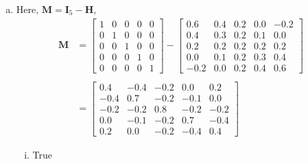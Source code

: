 \documentclass[12pt,letterpaper, onecolumn]{exam}
\begin{document}
\begin{questions}
\begin{solution}
\begin{enumerate}[a.)]
\begin{enumerate}[i.)]
            The identity of,
            \begin{equation*}
                \sum\limits_{i=1}^{n}\textbf{e}_i=0
            \end{equation*}
            does not hold if the intercept drops. 
        \end{enumerate}
        \item Here, $\textbf{M} = \textbf{I}_5 - \textbf{H}$,
        \begin{align*}
            \textbf{M} &= \left[\begin{array}{ccccc}
                1 & 0 & 0 & 0 & 0 \\
                0 & 1 & 0 & 0 & 0 \\
                0 & 0 & 1 & 0 & 0 \\
                0 & 0 & 0 & 1 & 0 \\
                0 & 0 & 0 & 0 & 1
            \end{array} \right] - \left[\begin{array}{ccccc}
                 0.6 & 0.4 & 0.2 & 0.0 & -0.2 \\
                 0.4 & 0.3 & 0.2 & 0.1 &  0.0 \\
                 0.2 & 0.2 & 0.2 & 0.2 &  0.2 \\
                 0.0 & 0.1 & 0.2 & 0.3 &  0.4 \\
                -0.2 & 0.0 & 0.2 & 0.4 &  0.6
            \end{array}\right] \\ \\
            & = \left[\begin{array}{ccccc}
                 0.4 & -0.4 & -0.2 &  0.0 &  0.2 \\
                -0.4 &  0.7 & -0.2 & -0.1 &  0.0 \\
                -0.2 & -0.2 &  0.8 & -0.2 & -0.2 \\
                 0.0 & -0.1 & -0.2 &  0.7 & -0.4 \\
                 0.2 &  0.0 & -0.2 & -0.4 &  0.4
            \end{array}\right]
        \end{align*}
        \begin{enumerate}[i.)]
            \item True


\end{enumerate}
\end{enumerate}
\end{solution}
\end{questions}
\end{document}
